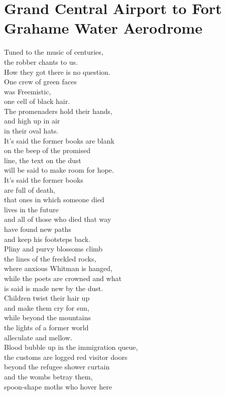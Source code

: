 \documentclass[smalldemyvopaper,11pt,twoside,onecolumn,openright,extrafontsizes]{memoir}
\begin{document}
\chapter{Grand Central Airport to Fort Grahame Water Aerodrome}
Tuned to the music of centuries,
\\the robber chants to us.
\\How they got there is no question.
\\One crew of green faces
\\was Freemistic,
\\one cell of black hair.
\\The promenaders hold their hands,
\\and high up in air
\\in their oval hats.
\\It's said the former books are blank
\\on the beep of the promised
\\line, the text on the dust
\\will be said to make room for hope.
\\It's said the former books
\\are full of death,
\\that ones in which someone died
\\lives in the future
\\and all of those who died that way
\\have found new paths
\\and keep his footsteps back.
\\Pliny and purvy blossoms climb
\\the lines of the freckled rocks,
\\where anxious Whitman is hanged,
\\while the poets are crowned and what
\\is said is made new by the dust.
\\Children twist their hair up
\\and make them cry for sun,
\\while beyond the mountains
\\the lights of a former world
\\alleculate and mellow.
\\Blood bubble up in the immigration queue,
\\the customs are logged red visitor doors
\\beyond the refugee shower curtain
\\and the wombs betray them,
\\spoon-shape moths who hover here
\end{document}
